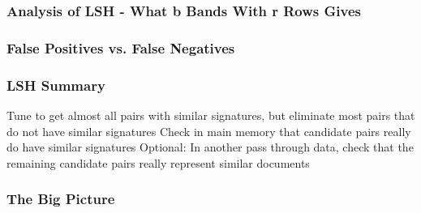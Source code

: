 \documentclass[svgnames]{beamer}
\begin{document}
  

  
\begin{frame} \frametitle{Analysis of LSH - What b Bands With r Rows Gives}


\end{frame}

  
\begin{frame} \frametitle{False Positives vs. False Negatives}


\end{frame}

  
\begin{frame} \frametitle{LSH Summary}

Tune to get almost all pairs with similar signatures, but eliminate most pairs that do not have similar signatures
Check in main memory that candidate pairs really do have similar signatures
Optional: In another pass through data, check that the remaining candidate pairs really represent similar documents

\end{frame}

  
\begin{frame} \frametitle{The Big Picture}


\end{frame}


\end{document}
